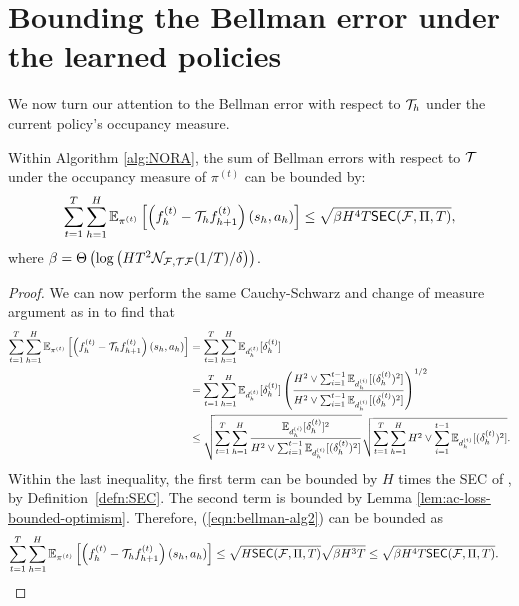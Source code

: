\section{Bounding the Bellman error under the learned policies}

We now turn our attention to the Bellman error with respect to ${\mathcal{T}}_h$ under the current policy's occupancy measure.

\begin{lem}
Within Algorithm \ref{alg:NORA}, the sum of Bellman errors with respect to ${\mathcal{T}}$ under the occupancy measure of $\pi^{(t)}$ can be bounded by: 
    $$\sum_{t=1}^T \sum_{h=1}^H\mathbb{E}_{\pi^{(t)}}\left[\left(f_h^{(t)}-{\mathcal{T}}_h f_{h+1}^{(t)}\right)\left(s_h, a_h\right)\right] \leq \sqrt{\beta H^4 T\mathsf{SEC}({\mathcal{F}}, \Pi, T)},$$
    where $\beta = \Theta\left(\log \left(HT^2 \mathcal{N}_{{\mathcal{F}},{\mathcal{T}} {\mathcal{F}}}(1/T) / \delta\right) \right)$.
    \label{lem:occ-measure-regret-nora}
\end{lem}
\begin{proof}
We can now perform the same Cauchy-Schwarz and change of measure argument as in \citet{xie2022role} to find that
\begin{align}\label{eqn:bellman-alg2}
\sum_{t=1}^T \sum_{h=1}^H\mathbb{E}_{\pi^{(t)}}\left[\left(f_h^{(t)}-{\mathcal{T}}_h f_{h+1}^{(t)}\right)\left(s_h, a_h\right)\right] &=
    \sum_{t=1}^T \sum_{h=1}^H \mathbb{E}_{d_h^{(t)}}[\delta_h^{(t)}]\nonumber\\
    &= \sum_{t=1}^T \sum_{h=1}^H \mathbb{E}_{d_h^{(t)}}[\delta_h^{(t)}] \left(\frac{H^2 \vee \sum_{i=1}^{t-1}\mathbb{E}_{d_h^{(i)}}[(\delta_h^{(t)})^2]}{H^2 \vee \sum_{i=1}^{t-1}\mathbb{E}_{d_h^{(i)}}[(\delta_h^{(t)})^2]}\right)^{1/2} \nonumber\\
    &\leq \sqrt{\sum_{t=1}^T\sum_{h=1}^H \frac{\mathbb{E}_{d_h^{(i)}}[\delta_h^{(t)}]^2}{H^2 \vee \sum_{i=1}^{t-1}\mathbb{E}_{d_h^{(i)}}[(\delta_h^{(t)})^2]}}\sqrt{\sum_{t=1}^T\sum_{h=1}^H H^2 \vee \sum_{i=1}^{t-1}\mathbb{E}_{d_h^{(i)}}[(\delta_h^{(t)})^2]}. 
\end{align}
Within the last inequality, the first term can be bounded by $H$ times the SEC of \citet{xie2022role}, by Definition~\ref{defn:SEC}. The second term is bounded by Lemma \ref{lem:ac-loss-bounded-optimism}. Therefore, (\ref{eqn:bellman-alg2}) can be bounded as
\begin{align}
    \sum_{t=1}^T \sum_{h=1}^H\mathbb{E}_{\pi^{(t)}}\left[\left(f_h^{(t)}-{\mathcal{T}}_h f_{h+1}^{(t)}\right)\left(s_h, a_h\right)\right] &\leq \sqrt{H\mathsf{SEC}({\mathcal{F}}, \Pi, T)}\sqrt{\beta H^3 T}\leq \sqrt{\beta H^4 T \mathsf{SEC}({\mathcal{F}}, \Pi, T)}.
\end{align}
\end{proof}

